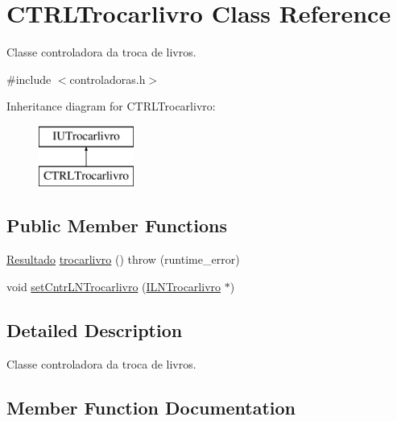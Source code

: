 \hypertarget{classCTRLTrocarlivro}{}\section{C\+T\+R\+L\+Trocarlivro Class Reference}
\label{classCTRLTrocarlivro}


Classe controladora da troca de livros.  




{\ttfamily \#include $<$controladoras.\+h$>$}

Inheritance diagram for C\+T\+R\+L\+Trocarlivro\+:\begin{figure}[H]
\begin{center}
\leavevmode
\includegraphics[height=2.000000cm]{classCTRLTrocarlivro}
\end{center}
\end{figure}
\subsection*{Public Member Functions}
\begin{DoxyCompactItemize}
\item 
\hyperlink{classResultado}{Resultado} \hyperlink{classCTRLTrocarlivro_ab0bd103af757427e4272e44dfbe47a49}{trocarlivro} ()  throw (runtime\+\_\+error)
\item 
void \hyperlink{classCTRLTrocarlivro_af157f82ed9d7febfe8f4175d50990e8e}{set\+Cntr\+L\+N\+Trocarlivro} (\hyperlink{classILNTrocarlivro}{I\+L\+N\+Trocarlivro} $\ast$)
\end{DoxyCompactItemize}


\subsection{Detailed Description}
Classe controladora da troca de livros. 

\subsection{Member Function Documentation}
\mbox{\label{classCTRLTrocarlivro_af157f82ed9d7febfe8f4175d50990e8e}} 
